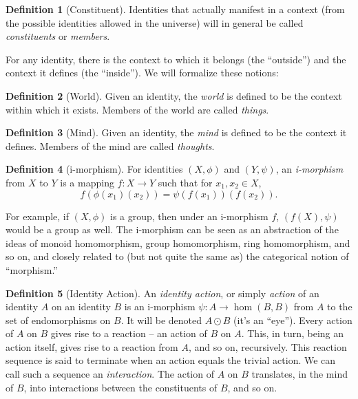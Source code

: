 \documentclass[pra,twocolumn,groupedaddress,10pt]{revtex4}
\theoremstyle{definition}
\newtheorem{defn}{Definition}[section]
\begin{document}
\begin{defn}[Constituent]
	Identities that actually manifest in a context (from the possible identities allowed in the universe) will in general be called \emph{constituents} or \emph{members}.
\end{defn}

For any identity, there is the context to which it belongs (the ``outside'') and the context it defines (the ``inside''). We will formalize these notions:

\begin{defn}[World]
	Given an identity, the \emph{world} is defined to be the context within which it exists. Members of the world are called \emph{things}.
\end{defn}

\begin{defn}[Mind]
	Given an identity, the \emph{mind} is defined to be the context it defines. Members of the mind are called \emph{thoughts}.
\end{defn}


\begin{defn}[i-morphism]
	For identities $(X, \phi)$ and $(Y, \psi)$, an \emph{i-morphism} from $X$ to $Y$ is a mapping $f : X \rightarrow Y$ such that for $x_1, x_2 \in X$,
\begin{equation}
		f(\phi(x_1)(x_2)) = \psi(f(x_1))(f(x_2)) . %
	\nonumber
\end{equation}
\end{defn}

For example, if $(X, \phi)$ is a group, then under an i-morphism $f$, $(f(X), \psi)$ would be a group as well. The i-morphism can be seen as an abstraction of the ideas of monoid homomorphism, group homomorphism, ring homomorphism, and so on, and closely related to (but not quite the same as) the categorical notion of ``morphism.''

\begin{defn}[Identity Action]
	An \emph{identity action}, or simply \emph{action} of an identity $A$ on an identity $B$ is an i-morphism $\psi : A \rightarrow \hom(B,B)$ from $A$ to the set of endomorphisms on $B$. It will be denoted $A \odot B$ (it's an ``eye''). Every action of $A$ on $B$ gives rise to a reaction -- an action of $B$ on $A$. This, in turn, being an action itself, gives rise to a reaction from $A$, and so on, recursively. This reaction sequence is said to terminate when an action equals the trivial action. We can call such a sequence an \emph{interaction}. The action of $A$ on $B$ translates, in the mind of $B$, into interactions between the constituents of $B$, and so on.
\end{defn}
\end{document}

